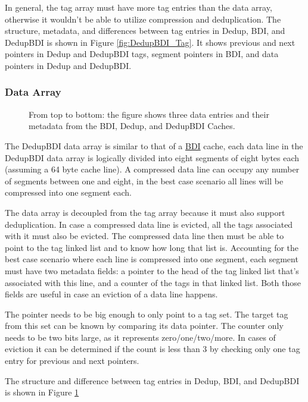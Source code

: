 In general, the tag array must have more tag entries than the data array, otherwise it wouldn't be able to utilize compression and deduplication. The structure, metadata, and differences between tag entries in Dedup, BDI, and DedupBDI is shown in Figure \ref{fig:DedupBDI_Tag}. It shows previous and next pointers in Dedup and DedupBDI tags, segment pointers in BDI, and data pointers in Dedup and DedupBDI.
\subsubsection{Data Array}
\label{sssec:DedupBDIData}
\begin{figure}
    \caption[DedupBDI Data Array]{From top to bottom: the figure shows three data entries and their metadata from the BDI, Dedup, and DedupBDI Caches.}
    \label{fig:DedupBDI_Data}
\end{figure}
The DedupBDI data array is similar to that of a \hyperref[sssec:BDIData]{BDI} cache, each data line in the DedupBDI data array is logically divided into eight segments of eight bytes each (assuming a 64 byte cache line). A compressed data line can occupy any number of segments between one and eight, in the best case scenario all lines will be compressed into one segment each.\par
The data array is decoupled from the tag array because it must also support deduplication. In case a compressed data line is evicted, all the tags associated with it must also be evicted. The compressed data line then must be able to point to the tag linked list and to know how long that list is. Accounting for the best case scenario where each line is compressed into one segment, each segment must have two metadata fields: a pointer to the head of the tag linked list that's associated with this line, and a counter of the tags in that linked list. Both those fields are useful in case an eviction of a data line happens.\par
The pointer needs to be big enough to only point to a tag set. The target tag from this set can be known by comparing its data pointer. The counter only needs to be two bits large, as it represents zero/one/two/more. In cases of eviction it can be determined if the count is less than 3 by checking only one tag entry for previous and next pointers.\par
The structure and difference between tag entries in Dedup, BDI, and DedupBDI is shown in Figure \ref{fig:DedupBDI_Data}
